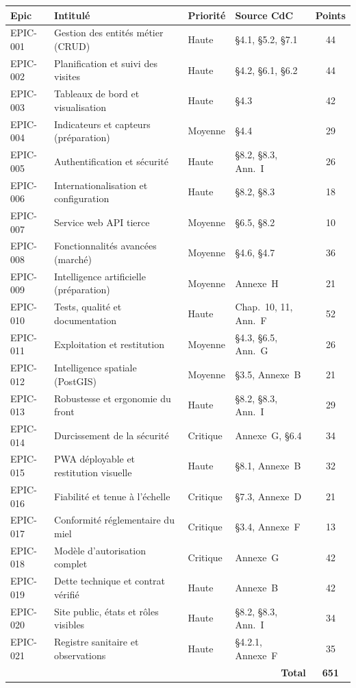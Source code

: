 \begin{center}
\begin{tabular}{lp{6.2cm}llc}
\toprule
\textbf{Epic} & \textbf{Intitulé} & \textbf{Priorité} & \textbf{Source CdC} & \textbf{Points} \\
\midrule
EPIC-001 & Gestion des entités métier (CRUD)        & Haute   & \S4.1, \S5.2, \S7.1   & 44 \\
EPIC-002 & Planification et suivi des visites       & Haute   & \S4.2, \S6.1, \S6.2   & 44 \\
EPIC-003 & Tableaux de bord et visualisation        & Haute   & \S4.3                 & 42 \\
EPIC-004 & Indicateurs et capteurs (préparation)    & Moyenne & \S4.4                 & 29 \\
EPIC-005 & Authentification et sécurité             & Haute   & \S8.2, \S8.3, Ann.~I  & 26 \\
EPIC-006 & Internationalisation et configuration    & Haute   & \S8.2, \S8.3          & 18 \\
EPIC-007 & Service web API tierce                   & Moyenne & \S6.5, \S8.2          & 10 \\
EPIC-008 & Fonctionnalités avancées (marché)        & Moyenne & \S4.6, \S4.7          & 36 \\
EPIC-009 & Intelligence artificielle (préparation)  & Moyenne & Annexe~H              & 21 \\
EPIC-010 & Tests, qualité et documentation          & Haute   & Chap.~10, 11, Ann.~F  & 52 \\
EPIC-011 & Exploitation et restitution              & Moyenne & \S4.3, \S6.5, Ann.~G  & 26 \\
EPIC-012 & Intelligence spatiale (PostGIS)          & Moyenne & \S3.5, Annexe~B       & 21 \\
EPIC-013 & Robustesse et ergonomie du front         & Haute   & \S8.2, \S8.3, Ann.~I  & 29 \\
EPIC-014 & Durcissement de la sécurité              & Critique& Annexe~G, \S6.4       & 34 \\
EPIC-015 & PWA déployable et restitution visuelle   & Haute   & \S8.1, Annexe~B       & 32 \\
EPIC-016 & Fiabilité et tenue à l'échelle           & Critique& \S7.3, Annexe~D       & 21 \\
EPIC-017 & Conformité réglementaire du miel         & Critique& \S3.4, Annexe~F       & 13 \\
EPIC-018 & Modèle d'autorisation complet            & Critique& Annexe~G              & 42 \\
EPIC-019 & Dette technique et contrat vérifié       & Haute   & Annexe~B              & 42 \\
EPIC-020 & Site public, états et rôles visibles     & Haute   & \S8.2, \S8.3, Ann.~I  & 34 \\
EPIC-021 & Registre sanitaire et observations      & Haute   & \S4.2.1, Annexe~F     & 35 \\
\midrule
\multicolumn{4}{r}{\textbf{Total}} & \textbf{651} \\
\bottomrule
\end{tabular}
\end{center}

